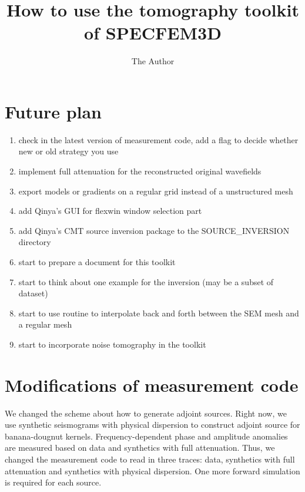\documentclass[11pt]{article}
\title{How to use the tomography toolkit of SPECFEM3D}
\author{The Author}
\begin{document}
\maketitle

\section{Future plan}
\begin{enumerate}
\item check in the latest version of measurement code, add a flag to decide whether new or old strategy you use
\item implement full attenuation for the reconstructed original wavefields
\item export models or gradients on a regular grid instead of a unstructured mesh
\item add Qinya's GUI for flexwin window selection part
\item add Qinya's CMT source inversion package to the SOURCE\_INVERSION directory
\item start to prepare a document for this toolkit
\item start to think about one example for the inversion (may be a subset of dataset)
\item start to use routine to interpolate back and forth between the SEM mesh and a regular mesh
\item start to incorporate noise tomography in the toolkit
\end{enumerate}


\section{Modifications of measurement code}
We changed the scheme about how to generate adjoint sources.
Right now, we use synthetic seismograms with physical dispersion to construct adjoint source for banana-dougnut kernels.
Frequency-dependent phase and amplitude anomalies are measured based on data and synthetics with full attenuation.
Thus, we changed the measurement code to read in three traces: data, synthetics with full attenuation and synthetics with physical dispersion.
One more forward simulation is required for each source.
\end{document}
